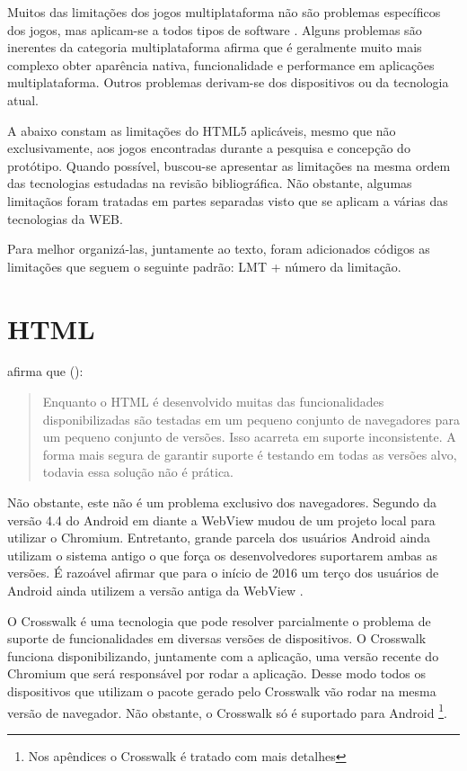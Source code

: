 
Muitos das limitações dos jogos multiplataforma não são
problemas específicos dos jogos, mas aplicam-se a todos tipos
de software \autocite[p. 3]{currentStateCrossPlatform}. Alguns
problemas são inerentes da categoria multiplataforma \cite[p.
7 ]{viabilityBusinessApplications} afirma que é geralmente muito
mais complexo obter aparência nativa, funcionalidade e performance
em aplicações multiplataforma. Outros problemas derivam-se dos
dispositivos ou da tecnologia atual.

A abaixo constam as limitações do HTML5 aplicáveis, mesmo que não
exclusivamente, aos jogos encontradas durante a pesquisa e concepção
do protótipo. Quando possível, buscou-se apresentar as limitações na
mesma ordem das tecnologias estudadas na revisão bibliográfica. Não
obstante, algumas limitaçãos foram tratadas em partes
separadas visto que se aplicam a várias das tecnologias da WEB.

Para melhor organizá-las, juntamente ao texto, foram adicionados códigos as limitações
 que seguem o seguinte padrão: LMT + número da limitação.

\section{HTML}

\citet{crossPlatformMobileGame} afirma que ():
\begin{quote}
Enquanto o HTML é desenvolvido muitas das funcionalidades
disponibilizadas são testadas em um pequeno conjunto de navegadores
para um pequeno conjunto de versões. Isso acarreta em suporte
inconsistente. A forma mais segura de garantir suporte é testando em
todas as versões alvo, todavia essa solução não é prática.
\end{quote}

Não obstante, este não é um problema exclusivo dos navegadores.  
Segundo \citet{chromeWebView} da versão 4.4 do Android em diante a
WebView mudou de um projeto local para utilizar o Chromium. Entretanto,
grande parcela dos usuários Android ainda utilizam o sistema antigo o
que força os desenvolvedores suportarem ambas as versões. É razoável
afirmar que para o início de 2016 um terço dos usuários de Android
ainda utilizem a versão antiga da WebView \citet{chromeWebView}.

O Crosswalk é uma tecnologia que pode resolver parcialmente o problema
de suporte de funcionalidades em diversas versões de dispositivos.
O Crosswalk funciona disponibilizando, juntamente com a aplicação,
uma versão recente do Chromium que será responsável por rodar a
aplicação. Desse modo todos os dispositivos que utilizam o pacote
gerado pelo Crosswalk vão rodar na mesma versão de navegador. Não
obstante, o Crosswalk só é suportado para Android \footnote{Nos
apêndices o Crosswalk é tratado com mais detalhes}.

